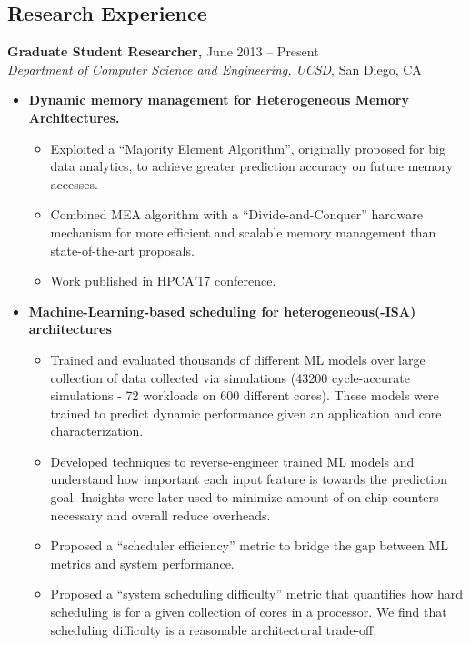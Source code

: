 \documentclass[11pt]{myres} %
\begin{document}
\begin{resume}
\section{Research Experience}

{\color{blue}\textbf{Graduate Student Researcher,} June 2013 -- Present} \\
\emph{Department of Computer Science and Engineering, UCSD}, San Diego, CA \\
\begin{itemize} \itemsep -2pt
    \item \textbf{Dynamic memory management for Heterogeneous Memory Architectures.}
    \begin{itemize}
        \item Exploited a ``Majority Element Algorithm'', originally proposed for big data analytics, to achieve greater prediction accuracy on future memory accesses.
        \item Combined MEA algorithm with a ``Divide-and-Conquer'' hardware mechanism for more efficient and scalable memory management than state-of-the-art proposals.
        \item Work published in HPCA'17 conference.
    \end{itemize}
    \item \textbf{Machine-Learning-based scheduling for heterogeneous(-ISA) architectures }
    \begin{itemize}
        \item Trained and evaluated thousands of different ML models over large collection of data collected via simulations (43200 cycle-accurate simulations - 72 workloads on 600 different cores). These models were trained to predict dynamic performance given an application and core characterization.
        \item Developed techniques to reverse-engineer trained ML models and understand how important each input feature is towards the prediction goal. Insights were later used to minimize amount of on-chip counters necessary and overall reduce overheads.
        \item Proposed a ``scheduler efficiency'' metric to bridge the gap between ML metrics and system performance.
        \item Proposed a ``system scheduling difficulty'' metric that quantifies how hard scheduling is for a given collection of cores in a processor. We find that scheduling difficulty is a reasonable architectural trade-off.
    \end{itemize}
\end{itemize}


\end{resume}
\end{document}

